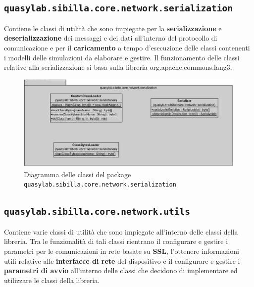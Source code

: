 \subsection{\texttt{quasylab.sibilla.core.network.serialization}} Contiene le classi di utilità che sono impiegate per la \textbf{serializzazione} e \textbf{deserializzazione} dei messaggi e dei dati all’interno del protocollo di comunicazione e per il \textbf{caricamento} a tempo d’esecuzione delle classi contenenti i modelli delle simulazioni da elaborare e gestire. Il funzionamento delle classi relative alla serializzazione si basa sulla libreria org.apache.commons.lang3.

\begin{figure}[H]
    \includegraphics[width=\linewidth]{images/quasylab.sibilla.core.network.serialization.png}
    \captionsetup{justification=centering}
    \caption{Diagramma delle classi del package \texttt{quasylab.sibilla.core.network.serialization}}
  \end{figure}

\subsection{\texttt{quasylab.sibilla.core.network.utils}} Contiene varie classi di utilità che sono impiegate all’interno delle classi della libreria. Tra le funzionalità di tali classi rientrano il configurare e gestire i parametri per le comunicazioni in rete basate su \textbf{SSL}, l’ottenere informazioni utili relative alle \textbf{interfacce di rete} del dispositivo e il configurare e gestire i \textbf{parametri di avvio} all’interno delle classi che decidono di implementare ed utilizzare le classi della libreria.

